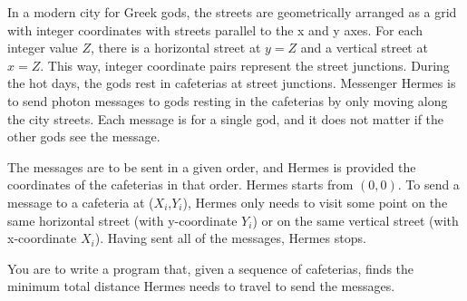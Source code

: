 In a modern city for Greek gods, the streets are geometrically arranged as a grid with integer coordinates with streets parallel to the x and y axes. For each integer value $Z$, there is a horizontal street at $y=Z$ and a vertical street at $x=Z$. This way, integer coordinate pairs represent the street junctions. During the hot days, the gods rest in cafeterias at street junctions. Messenger Hermes is to send photon messages to gods resting in the cafeterias by only moving along the city streets. Each message is for a single god, and it does not matter if the other gods see the message.


The messages are to be sent in a given order, and Hermes is provided the coordinates of the cafeterias in that order. Hermes starts from $(0,0)$. To send a message to a cafeteria at ($X_i$,$Y_i$), Hermes only needs to visit some point on the same horizontal street (with y-coordinate $Y_i$) or on the same vertical street (with x-coordinate $X_i$). Having sent all of the messages, Hermes stops.

You are to write a program that, given a sequence of cafeterias, finds the minimum total distance Hermes needs to travel to send the messages.
